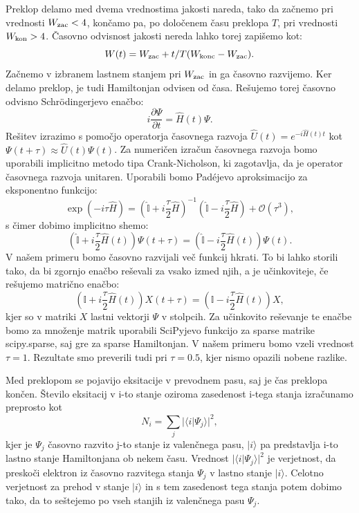 Preklop delamo med dvema vrednostima jakosti nareda, tako da začnemo pri vrednosti $W_{\textup{zac}}<4$, končamo pa, po določenem času preklopa $T$, pri vrednosti $W_{\textup{kon}}>4$.
Časovno odvisnost jakosti nereda lahko torej zapišemo kot: 
\begin{equation}
W(t) = W_{\textup{zac}} +  t/T (W_{\textup{konc}}-W_{\textup{zac}}).
\end{equation} 
Začnemo v izbranem lastnem stanjem pri $W_{\textup{zac}}$ in ga časovno razvijemo. Ker delamo preklop, je tudi Hamiltonjan odvisen od časa.
Rešujemo torej časovno odvisno Schrödingerjevo enačbo:
\begin{equation}
i \frac{\partial \Psi}{\partial t} = \hat{H}(t) \Psi.
\end{equation}
Rešitev izrazimo s pomočjo operatorja časovnega razvoja $\hat{U}(t) = e^{-i \hat{H}(t) t}$ kot $\Psi(t+\tau) \approx \hat{U}(t) \Psi(t)$.
Za numeričen izračun časovnega razvoja bomo uporabili implicitno metodo tipa Crank-Nicholson, ki zagotavlja, da je operator časovnega razvoja unitaren.
Uporabili bomo Padéjevo aproksimacijo za eksponentno funkcijo:
\begin{equation}
\exp (-i \tau \hat{H}) = \left(\hat{\mathbb{I}} + i \frac{\tau}{2} \hat{H} \right)^{-1}   \left(\hat{\mathbb{I}} - i \frac{\tau}{2} \hat{H} \right) + \mathcal{O}(\tau^3),
\end{equation} 
s čimer dobimo implicitno shemo:
\begin{equation}
\left( \hat{\mathbb{I}} + i \frac{\tau}{2} \hat{H}(t) \right) \Psi (t+\tau) = \left(\hat{\mathbb{I}}- i \frac{\tau}{2} \hat{H}(t) \right) \Psi(t).
\end{equation}
V našem primeru bomo časovno razvijali več funkcij hkrati. To bi lahko storili tako, da bi zgornjo enačbo reševali za vsako izmed njih, a je učinkoviteje, če rešujemo matrično enačbo:
\begin{equation}
\left( \mathbb{I} + i \frac{\tau}{2} \hat{H}(t) \right) X(t+\tau) = \left(\mathbb{I}- i \frac{\tau}{2} \hat{H}(t) \right) X,
\end{equation}
kjer so v matriki $X$ lastni vektorji $\Psi$ v stolpcih.
Za učinkovito reševanje te enačbe bomo za množenje matrik uporabili SciPyjevo funkcijo za sparse matrike scipy.sparse, saj gre za sparse Hamiltonjan.
V našem primeru bomo vzeli vrednost $\tau=1$. Rezultate smo preverili tudi pri $\tau=0.5$, kjer nismo opazili nobene razlike.

Med preklopom se pojavijo eksitacije v prevodnem pasu, saj je čas preklopa končen.
Število eksitacij v i-to stanje oziroma zasedenost i-tega stanja izračunamo preprosto kot
\begin{equation}
N_i = \sum_j |\langle i | \Psi_j \rangle|^2,
\end{equation}
kjer je $\Psi_j$ časovno razvito j-to stanje iz valenčnega pasu, $| i \rangle$ pa predstavlja i-to lastno stanje Hamiltonjana ob nekem času. Vrednost $| \langle i | \Psi_j \rangle |^2$ je verjetnost, da preskoči elektron iz časovno razvitega stanja $\Psi_j$ v lastno stanje $| i \rangle$. Celotno verjetnost za prehod v stanje $| i \rangle$ in s tem zasedenost tega stanja potem dobimo tako, da to seštejemo po vseh stanjih iz valenčnega pasu $\Psi_j$.

